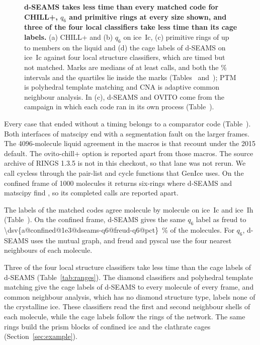 \documentclass[preprint,12pt]{elsarticle}
\begin{document}
\begin{figure}[tbp]
\centering

\caption{\textbf{d-SEAMS takes less time than every matched code for CHILL+, $q_6$ and primitive rings at every size shown, and three of the four local classifiers take less time than its cage labels.}
(a) CHILL+ and (b) $q_6$ on ice~Ic, (c) primitive rings of up to  members on the liquid and (d) the cage labels of d-SEAMS on ice~Ic against four local structure classifiers, which are timed but not matched.
Marks are medians of at least  calls, and both the \% intervals and the quartiles lie inside the marks (Tables~ and~); PTM is polyhedral template matching and CNA is adaptive common neighbour analysis.
In (c), d-SEAMS and OVITO come from the campaign in which each code ran in its own process (Table~).}
\label{fig:codes}
\end{figure}

Every case that ended without a timing belongs to a comparator code (Table~).
Both interfaces of matscipy end with a segmentation fault on the larger frames.
The 4096-molecule liquid agreement in the macros is that recount under
the 2015 default.
The ovito-chill+ option is reported apart from those macros.
The source archive of RINGS 1.3.5 is not in this checkout, so that lane was not rerun.
We call cycless through the pair-list and cycle functions that GenIce uses.
On the confined frame of \num{1000} molecules it returns  six-rings where d-SEAMS and matscipy find , so its completed calls are reported apart.

The labels of the matched codes agree molecule by molecule on ice~Ic and ice~Ih (Table~).
On the confined frame, d-SEAMS gives the same $q_6$ label as freud to \qty{\dsv{a@confined@1e3@dseams-q6@freud-q6@pct}}{\percent} of the molecules.
For $q_6$, d-SEAMS uses the mutual graph, and freud and pyscal use the four nearest neighbours of each molecule.

Three of the four local structure classifiers take less time than the cage labels of d-SEAMS (Table~\ref{tab:ranges}).
The diamond classifiers and polyhedral template matching give the cage labels of d-SEAMS to every molecule of every frame, and common neighbour analysis, which has no diamond structure type, labels none of the crystalline ice.
These classifiers read the first and second neighbour shells of each molecule, while the cage labels follow the rings of the network.
The same rings build the prism blocks of confined ice and the clathrate cages (Section~\ref{sec:example}).
\end{document}
